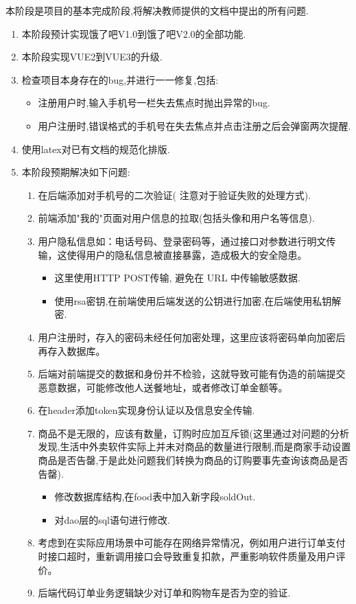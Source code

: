 本阶段是项目的基本完成阶段,将解决教师提供的文档中提出的所有问题.
  \begin{enumerate}
\item 本阶段预计实现饿了吧V1.0到饿了吧V2.0的全部功能.
\item 本阶段实现VUE2到VUE3的升级.
\item 检查项目本身存在的bug,并进行一一修复,包括:
\begin{itemize}
  \item 注册用户时,输入手机号一栏失去焦点时抛出异常的bug.
  \item 用户注册时,错误格式的手机号在失去焦点并点击注册之后会弹窗两次提醒.
    \end{itemize}
\item 使用latex对已有文档的规范化排版.
\item  本阶段预期解决如下问题:
   \begin{enumerate}
       \item 在后端添加对手机号的二次验证( 注意对于验证失败的处理方式).
       \item 前端添加"我的"页面对用户信息的拉取(包括头像和用户名等信息).
       \item 用户隐私信息如：电话号码、登录密码等，通过接口对参数进行明文传输，这使得用户的隐私信息被直接暴露，造成极大的安全隐患。
       \begin{itemize}
       \item  这里使用HTTP POST传输, 避免在 URL 中传输敏感数据.
       \item 使用rsa密钥,在前端使用后端发送的公钥进行加密,在后端使用私钥解密.
          \end{itemize}
       \item ⽤户注册时，存⼊的密码未经任何加密处理，这⾥应该将密码单向加密后再存⼊数据库。
       \item 后端对前端提交的数据和身份并不检验，这就导致可能有伪造的前端提交恶意数据，可能修改他人送餐地址，或者修改订单金额等。
       \item 在header添加token实现身份认证以及信息安全传输.
       \item 商品不是无限的，应该有数量，订购时应加互斥锁(这里通过对问题的分析发现,生活中外卖软件实际上并未对商品的数量进行限制,而是商家手动设置商品是否告罄,于是此处问题我们转换为商品的订购要事先查询该商品是否告罄).
       \begin{itemize}
       \item 修改数据库结构,在food表中加入新字段soldOut.
       \item 对dao层的sql语句进行修改.
       \end{itemize}
       \item 考虑到在实际应用场景中可能存在网络异常情况，例如用户进行订单支付时接口超时，重新调用接口会导致重复扣款，严重影响软件质量及用户评价。
       \item  后端代码订单业务逻辑缺少对订单和购物⻋是否为空的验证.
   \end{enumerate}
 \end{enumerate}


